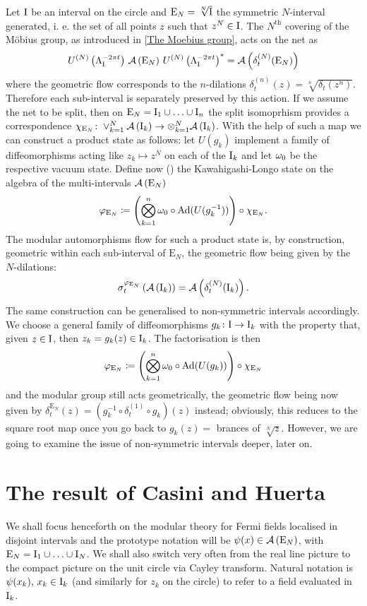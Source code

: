  \bigskip
 Let $\textrm{I}$ be an interval on the circle and $\textrm{E}_N=
 \sqrt[N]{\textrm{I}}$ the symmetric $N$-interval generated,
 i. e. the set of all points $z$ such that $z^N\in\textrm{I}$. 
 The $N^{\textrm{th}}$ covering of the M\"obius group, as introduced in
 \ref{The Moebius group}, acts on the net as
 \[
 U^{(N)}\left(\Lambda_{\textrm{I}}^{-2\pi t}\right)\,
 \mathcal{A}\left(\textrm{E}_N\right)\,
 {U^{(N)}\left(\Lambda_{\textrm{I}}^{-2\pi t}\right)}^*
 =\mathcal{A}\left(\delta^{(N)}_t(\textrm{E}_N)\right)
 \]
 where the geometric flow corresponds to the
 $n$-dilations $\delta_t^{(n)}(z)=\sqrt[n]{\delta_t(z^n)}$.
 Therefore each sub-interval is separately preserved
 by this action. If we assume the net to be split, then
 on $\textrm{E}_N=\textrm{I}_1\cup\ldots\cup \textrm{I}_n$ the split
 isomoprhism provides a correspondence 
 $\chi_{\textrm{E}_N}\colon\vee_{k=1}^N\mathcal{A}\left(\textrm{I}_k\right)\to
 \otimes_{k=1}^N\mathcal{A}\left(\textrm{I}_k\right)$. With the help of such
 a map we can construct a product state as follows:
 let $U(g_k)$ implement a family of diffeomorphisms acting like
 $z_k\mapsto z^N$ on each of the $\textrm{I}_k$ and let $\omega_0$ be the
 respective vacuum state. Define now (\cite{LMR:2009})
 the Kawahigashi-Longo state on the algebra of the
 multi-intervals $\mathcal{A}\left(\textrm{E}_N\right)$ 
 \begin{equation}
 \label{K-L state}
 \varphi_{\textrm{E}_N}\coloneqq 
 \left(\bigotimes_{k=1}^n \omega_0\circ \operatorname{Ad} (U(g_k^{-1}))\right)
 \circ\chi_{\textrm{E}_N}.
 \end{equation}
 The modular automorphisms flow for such a product 
 state is, by construction, geometric within each 
 sub-interval of $\textrm{E}_N$, the geometric flow
 being given by the $N$-dilations:
 \[
 \sigma_t^{\varphi_{\textrm{E}_N}}
 \left(\mathcal{A}\left(\textrm{I}_k\right)\right)=\mathcal{A}\left(\delta_t^{(N)}(\textrm{I}_k)\right).
 \]
 The same construction can be generalised to 
 non-symmetric intervals accordingly. We choose a 
 general family of diffeomorphisms $g_k\colon\textrm{I}\to\textrm{I}_k$
 with the property that, given $z\in\textrm{I}$, then $z_k=g_k(z)\in\textrm{I}_k$.
 The factorisation is then
 \[
 \varphi_{\textrm{E}_N}\coloneqq 
 \left(\bigotimes_{k=1}^n \omega_0\circ \operatorname{Ad} (U(g_k))\right)
 \circ\chi_{\textrm{E}_N}
 \]
 and the modular group still acts geometrically,
 the geometric flow being now given by
 $\delta_t^{\textrm{E}_N}(z)=(g_k^{-1}\circ 
 \delta_t^{(1)}\circ g_k)(z)$ instead;
 obviously, this reduces to the square root map
 once you go back to $g_k(z)=$ brances of $\sqrt[N]{z}$. 
 However, we are going to examine the issue of non-symmetric
 intervals deeper, later on.
 
 
 \section{The result of Casini and Huerta}
 \label{ResultCH}
 We shall focus henceforth on the modular theory for Fermi fields
 localised in disjoint intervals and the prototype notation
 will be $\psi(x)\in\mathcal{A}\left(\textrm{E}_N\right)$, with 
 $\textrm{E}_N=\textrm{I}_1\cup\ldots\cup\textrm{I}_N$. We shall also switch
 very often from the real line picture to the compact picture
 on the unit circle via Cayley transform. Natural notation
 is $\psi(x_k),\,x_k\in\textrm{I}_k$ (and similarly for $z_k$ on the
 circle) to refer to a field evaluated in $\textrm{I}_k$.
 
